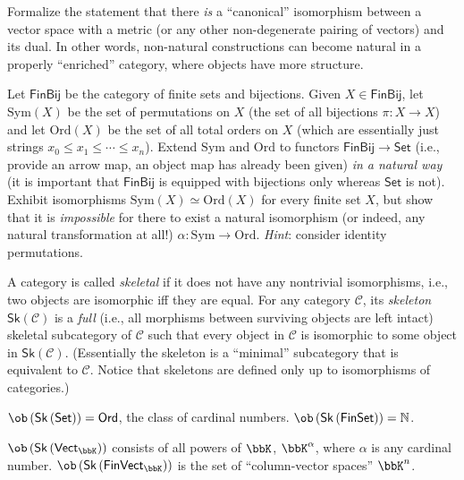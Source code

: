 %
\begin{xca}
    Formalize the statement that there \emph{is} a ``canonical'' isomorphism between a vector space with a metric (or any other non-degenerate pairing of vectors) and its dual. In other words, non-natural constructions can become natural in a properly ``enriched'' category, where objects have more structure.
\end{xca}
%
\begin{xca}
    Let $\mathsf{FinBij}$ be the category of finite sets and bijections. Given $X\in\mathsf{FinBij}$, let $\mathrm{Sym}(X)$ be the set of permutations on $X$ (the set of all bijections $\pi:X\to X$) and let $\mathrm{Ord}(X)$ be the set of all total orders on $X$ (which are essentially just strings $x_0\le x_1\le\cdots\le x_n$). Extend $\mathrm{Sym}$ and $\mathrm{Ord}$ to functors $\mathsf{FinBij}\to\mathsf{Set}$ (i.e., provide an arrow map, an object map has already been given) \emph{in a natural way} (it is important that $\mathsf{FinBij}$ is equipped with bijections only whereas $\mathsf{Set}$ is not). Exhibit isomorphisms $\mathrm{Sym}(X)\simeq\mathrm{Ord}(X)$ for every finite set $X$, but show that it is \emph{impossible} for there to exist a natural isomorphism (or indeed, any natural transformation at all!) $\alpha:\mathrm{Sym}\to\mathrm{Ord}$. \emph{Hint}: consider identity permutations.
\end{xca}
%
\begin{defn}[Skeleton]
A category is called \emph{skeletal} if it does not have any nontrivial
isomorphisms, i.e., two objects are isomorphic iff they are equal.
For any category $\mathcal{C}$, its \emph{skeleton} $\mathsf{Sk}\left(\mathcal{C}\right)$
is a \emph{full} (i.e., all morphisms between surviving objects are left intact) skeletal subcategory
of $\mathcal{C}$ such that every object in $\mathcal{C}$ is isomorphic
to some object in $\mathsf{Sk}\left(\mathcal{C}\right)$. (Essentially
the skeleton is a ``minimal'' subcategory that is equivalent to
$\mathcal{C}$. Notice that skeletons are defined only up to isomorphisms
of categories.)
\end{defn}
\begin{example}
$\ob\left(\mathsf{Sk}\left(\mathsf{Set}\right)\right)=\mathsf{Ord}$,
the class of cardinal numbers. $\ob\left(\mathsf{Sk}\left(\mathsf{FinSet}\right)\right)=\mathbb{N}$. 
\end{example}
%
\begin{example}
$\ob\left(\mathsf{Sk}\left(\mathsf{Vect}_{\bbK}\right)\right)$ consists
of all powers of $\bbK$, $\bbK^{\alpha}$, where $\alpha$ is any cardinal
number. $\ob\left(\mathsf{Sk}\left(\mathsf{FinVect}_{\bbK}\right)\right)$
is the set of ``column-vector spaces'' $\bbK^{n}$.
\end{example}
